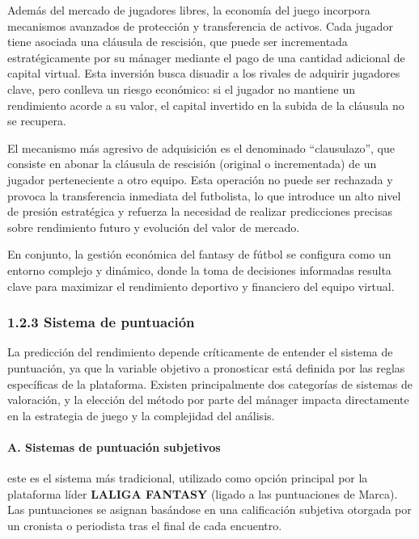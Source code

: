 Además del mercado de jugadores libres, la economía del juego incorpora mecanismos avanzados de 
protección y transferencia de activos.
Cada jugador tiene asociada una cláusula de rescisión, que puede ser incrementada estratégicamente 
por su mánager mediante el pago de una cantidad adicional de capital virtual.
Esta inversión busca disuadir a los rivales de adquirir jugadores clave, pero conlleva un riesgo 
económico: si el jugador no mantiene un rendimiento acorde a su valor, el capital invertido en la 
subida de la cláusula no se recupera.

El mecanismo más agresivo de adquisición es el denominado ``clausulazo'', que consiste en abonar 
la cláusula de rescisión (original o incrementada) de un jugador perteneciente a otro equipo.
Esta operación no puede ser rechazada y provoca la transferencia inmediata del futbolista, lo que 
introduce un alto nivel de presión estratégica y refuerza la necesidad de realizar predicciones 
precisas sobre rendimiento futuro y evolución del valor de mercado.

En conjunto, la gestión económica del fantasy de fútbol se configura como un entorno complejo y 
dinámico, donde la toma de decisiones informadas resulta clave para maximizar el rendimiento 
deportivo y financiero del equipo virtual.

\subsubsection{1.2.3 Sistema de puntuación}

La predicción del rendimiento depende críticamente de entender el sistema de puntuación, ya que 
la variable objetivo a pronosticar está definida por las reglas específicas de la plataforma.
Existen principalmente dos categorías de sistemas de valoración, y la elección del método por parte 
del mánager impacta directamente en la estrategia de juego y la complejidad del análisis.

\paragraph{A. Sistemas de puntuación subjetivos}

este es el sistema más tradicional, utilizado como opción principal por la plataforma líder 
\textbf{LALIGA FANTASY} (ligado a las puntuaciones de Marca).
Las puntuaciones se asignan basándose en una calificación subjetiva otorgada por un cronista o 
periodista tras el final de cada encuentro.

